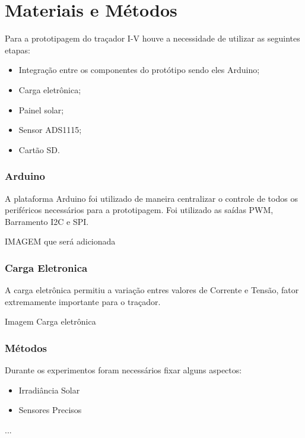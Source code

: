 \chapter{Materiais e Métodos}
\label{cap:03}

Para a prototipagem do traçador I-V houve a necessidade de utilizar as seguintes etapas:
\begin{itemize}
	\item Integração entre os componentes do protótipo sendo eles Arduino;
	\item Carga eletrônica;
	\item Painel solar;
	\item Sensor ADS1115;
	\item Cartão SD.
\end{itemize}

\subsection{Arduino}
A plataforma Arduino foi utilizado de maneira centralizar o controle de todos os periféricos necessários para a prototipagem. Foi utilizado as saídas PWM, Barramento I2C e SPI.

IMAGEM que será adicionada

\subsection{Carga Eletronica}
A carga eletrônica permitiu a variação entres valores de Corrente e Tensão, fator extremamente importante para o traçador.

Imagem Carga eletrônica



\subsection{Métodos}
Durante os experimentos foram necessários fixar alguns aspectos:
\begin{itemize}
\item Irradiância Solar
\item Sensores Precisos
\end{itemize}
...